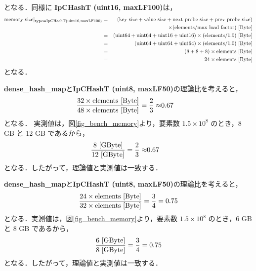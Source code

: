 となる．同様に {\bf IpCHashT (uint16, maxLF100)}は，
\begin{eqnarray*}
  {\rm memory\ size|_{type=IpCHashT (uint16, maxLF100)}} &=& ({\rm key\ size} + {\rm value\ size} + {\rm next\ probe\ size} + {\rm prev\ probe\ size})\\
                                              & & \times ({\rm elements} / {\rm max\ load\ factor}) {\rm\ [Byte]}\\
  &=& ({\rm uint64} + {\rm uint64} + {\rm uint16} + {\rm uint16}) \times ({\rm elements} / 1.0) {\rm\ [Byte]}\\
  &=& ({\rm uint64} + {\rm uint64} + {\rm uint64}) \times ({\rm elements} / 1.0) {\rm\ [Byte]}\\
  &=& (8 + 8 + 8) \times {\rm elements} {\rm\ [Byte]}\\
  &=& 24 \times {\rm elements} {\rm\ [Byte]}
\end{eqnarray*}
となる．

{\bf dense\_hash\_map}と{\bf IpCHashT (uint8, maxLF50)}の理論比を考えると，
\begin{eqnarray*}
  \frac{32 \times {\rm elements} {\rm\ [Byte]}}{48 \times {\rm elements} {\rm\ [Byte]}}
  = \frac{2}{3}\approx& 0.67
\end{eqnarray*}
となる．
実測値は，図\ref{fig_bench_memory}より，要素数 $1.5\times 10^8$ のとき，8 GB と 12 GB であるから，
\begin{eqnarray*}
  \frac{8 {\rm\ [GByte]}}{12 {\rm\ [GByte]}}
  = \frac{2}{3}\approx& 0.67
\end{eqnarray*}
となる．したがって，理論値と実測値は一致する．

{\bf dense\_hash\_map}と{\bf IpCHashT (uint8, maxLF50)}の理論比を考えると，
\begin{eqnarray*}
  \frac{24 \times {\rm elements} {\rm\ [Byte]}}{32 \times {\rm elements} {\rm\ [Byte]}}
  = \frac{3}{4}= 0.75
\end{eqnarray*}
となる．実測値は，図\ref{fig_bench_memory}より，要素数 $1.5\times 10^8$ のとき，6 GB と 8 GB であるから，
\begin{eqnarray*}
  \frac{6 {\rm\ [GByte]}}{8 {\rm\ [GByte]}}
  = \frac{3}{4}= 0.75
\end{eqnarray*}
となる．したがって，理論値と実測値は一致する．


